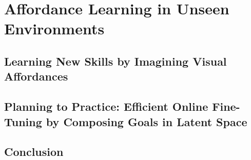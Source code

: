 \documentclass[ titlepage,numbers=noenddot,headinclude,
                footinclude=true,cleardoublepage=empty,abstractoff,
                BCOR=5mm,paper=letter,fontsize=12pt,
                american,
                openany
                ]{scrreprt}
\begin{document}
\part{Affordance Learning in Unseen Environments}

 \chapter{Learning New Skills by Imagining Visual Affordances}\label{chapter:val}

 \chapter{Planning to Practice: Efficient Online Fine-Tuning by Composing Goals in Latent Space}\label{chapter:ptp}


\chapter{Conclusion}\label{chapter:conclusion}


\printbibliography


% 

% 

% 

% 

% 

% 
\end{document}
